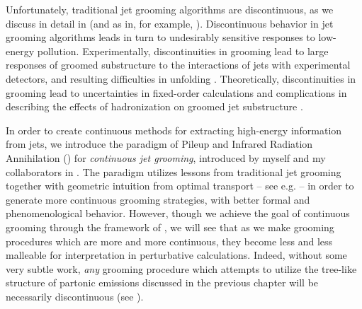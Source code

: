 Unfortunately, traditional jet grooming algorithms are discontinuous, as we discuss in detail in  (and as in, for example, ).
%
Discontinuous behavior in jet grooming algorithms leads in turn to undesirably sensitive responses to low-energy pollution.
%
Experimentally, discontinuities in grooming lead to large responses of groomed substructure to the interactions of jets with experimental detectors, and resulting difficulties in unfolding \cite{ATL-PHYS-PUB-2019-027,Aad:2019vyi,ATLAS:2020gwe}.
%
Theoretically, discontinuities in grooming lead to uncertainties in fixed-order calculations \cite{Larkoski:2014wba} and complications in describing the effects of \gls{hadronization} on groomed jet substructure \cite{Hoang:2019ceu}.


In order to create continuous methods for extracting high-energy information from jets, we introduce the paradigm of Pileup and Infrared Radiation Annihilation (\PIRANHA{}) for \emph{continuous jet grooming}, introduced by myself and my collaborators in .
%
The \PIRANHA{} paradigm utilizes lessons from traditional jet grooming together with geometric intuition from optimal transport -- see e.g.  -- in order to generate more continuous grooming strategies, with better formal and phenomenological behavior.
%
However, though we achieve the goal of continuous grooming through the framework of \PIRANHA{}, we will see that as we make grooming procedures which are more and more continuous, they become less and less malleable for interpretation in perturbative calculations.
%
Indeed, without some very subtle work, \textit{any} grooming procedure which attempts to utilize the tree-like structure of partonic emissions discussed in the previous chapter will be necessarily discontinuous (see ).




